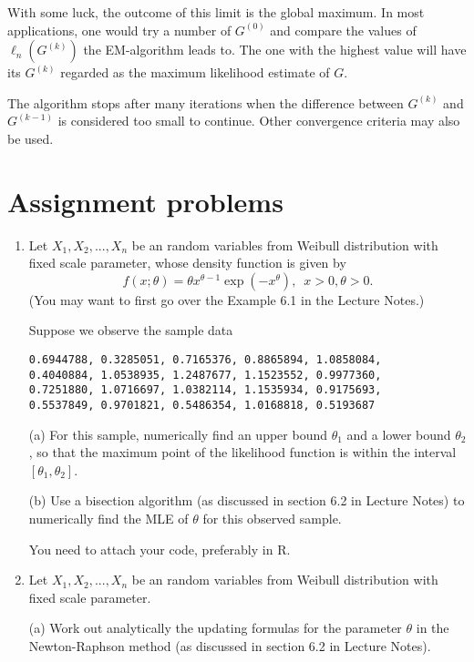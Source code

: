 With some luck, the outcome of this limit is the global maximum.
In most applications, one would try a number of $G^{(0)}$
and compare the values of $\ell_n(G^{(k)})$ the EM-algorithm leads to.
The one with the highest value will have its $G^{(k)}$ regarded
as the maximum likelihood estimate of $G$.

The algorithm stops after many iterations
when the difference between $G^{(k)}$ and $G^{(k-1)}$ is considered
too small to continue. Other convergence criteria may also be
used.

\section{Assignment problems}
\begin{enumerate}
\item 

Let $ X_{1}, X_{2}, ... , X_{n} $ be an \iid random variables from Weibull distribution with fixed scale parameter, whose density function is given by 
\[ 
f (x; \theta) = \theta x^{ \theta - 1 } \exp ( - x^{ \theta } ), \, \, \, x > 0, \theta > 0.  
\] 
(You may want to first go over the Example 6.1 in the Lecture Notes.) 

Suppose we observe the sample data 

\begin{verbatim} 
0.6944788, 0.3285051, 0.7165376, 0.8865894, 1.0858084, 
0.4040884, 1.0538935, 1.2487677, 1.1523552, 0.9977360, 
0.7251880, 1.0716697, 1.0382114, 1.1535934, 0.9175693, 
0.5537849, 0.9701821, 0.5486354, 1.0168818, 0.5193687 
\end{verbatim} 

(a) For this sample, numerically find an upper bound $ \theta_{1} $ and a lower bound $ \theta_{2} $, so that the maximum point of the likelihood function is within the interval $ [ \theta_{1}, \theta_{2} ] $.   

(b) Use a bisection algorithm (as discussed in section 6.2 in Lecture Notes) to numerically find the MLE of $ \theta $ for this observed sample. 

You need to attach your code, preferably in R. 
 

\item 
Let $ X_{1}, X_{2}, ... , X_{n} $ be an \iid random variables from Weibull distribution with fixed scale parameter. 

(a) Work out analytically the updating formulas for the parameter $ \theta $ in the 
Newton-Raphson method (as discussed in section 6.2 in Lecture Notes). 


\end{enumerate}
